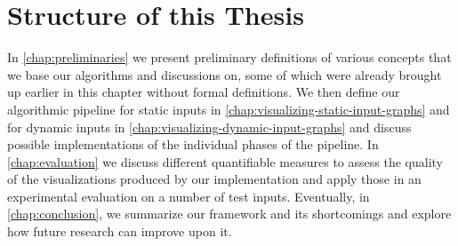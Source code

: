 \section{Structure of this Thesis}
\label{sect:structure-of-this-thesis}

In \cref{chap:preliminaries} we present preliminary definitions of various concepts that we base our algorithms and discussions on, some of which were already brought up earlier in this chapter without formal definitions.
We then define our algorithmic pipeline for static inputs in \cref{chap:visualizing-static-input-graphs} and for dynamic inputs in \cref{chap:visualizing-dynamic-input-graphs} and discuss possible implementations of the individual phases of the pipeline.
In \cref{chap:evaluation} we discuss different quantifiable measures to assess the quality of the visualizations produced by our implementation and apply those in an experimental evaluation on a number of test inputs.
Eventually, in \cref{chap:conclusion}, we summarize our framework and its shortcomings and explore how future research can improve upon it.
